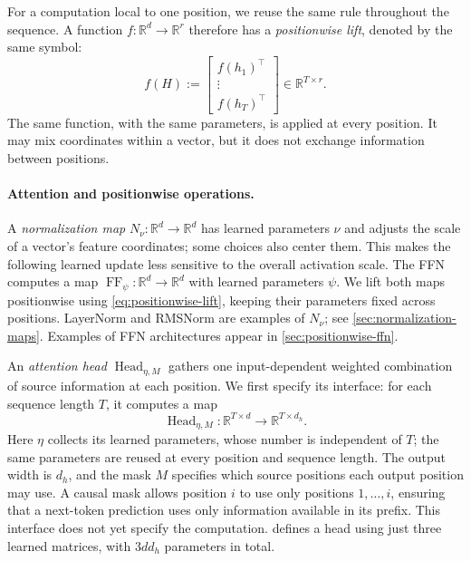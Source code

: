 \documentclass[11pt,twoside]{article}
\newcommand{\R}{\mathbb R}
\theoremstyle{plain}
\theoremstyle{definition}
\theoremstyle{remark}
\begin{document}
For a computation local to one position, we reuse the same rule throughout
the sequence. A function $f:\R^d\to\R^r$ therefore has a
\emph{positionwise lift}, denoted by the same symbol:
\begin{equation}
f(H):=
\begin{bmatrix}
f(h_1)^\top\\[-1mm]
\vdots\\[-1mm]
f(h_T)^\top
\end{bmatrix}
\in\R^{T\times r}.
\label{eq:positionwise-lift}
\end{equation}
The same function, with the same parameters, is applied at every position.
It may mix coordinates within a vector, but it does not exchange information
between positions.

\paragraph{Attention and positionwise operations.}
A \emph{normalization map} $N_\nu:\R^d\to\R^d$ has learned parameters $\nu$ and
adjusts the scale of a vector's feature coordinates; some choices also center
them. This makes the following learned update less sensitive to the overall
activation scale. The FFN computes a map $\operatorname{FF}_\psi:\R^d\to\R^d$ with learned
parameters $\psi$. We lift both maps positionwise using
\eqref{eq:positionwise-lift}, keeping their parameters fixed across positions.
LayerNorm and RMSNorm are examples of $N_\nu$;
see \cref{sec:normalization-maps}. Examples of FFN architectures appear in
\cref{sec:positionwise-ffn}.

An \emph{attention head} $\operatorname{Head}_{\eta,M}$ gathers one input-dependent weighted combination
of source information at each position. We first specify its interface:
for each sequence length $T$, it computes a map
\begin{equation}
\operatorname{Head}_{\eta,M}:
\R^{T\times d}\longrightarrow\R^{T\times d_h}.
\label{eq:head-interface}
\end{equation}
Here $\eta$ collects its learned parameters, whose number is independent of
$T$; the same parameters are reused at every position and sequence length.
The output width is $d_h$, and the mask $M$ specifies which source positions
each output position may use.
A causal mask allows position $i$ to use only positions $1,\ldots,i$,
ensuring that a next-token prediction uses only information available in
its prefix.
This interface does not yet specify the computation.
 defines a head using just three learned matrices,
with $3dd_h$ parameters in total.
\end{document}
